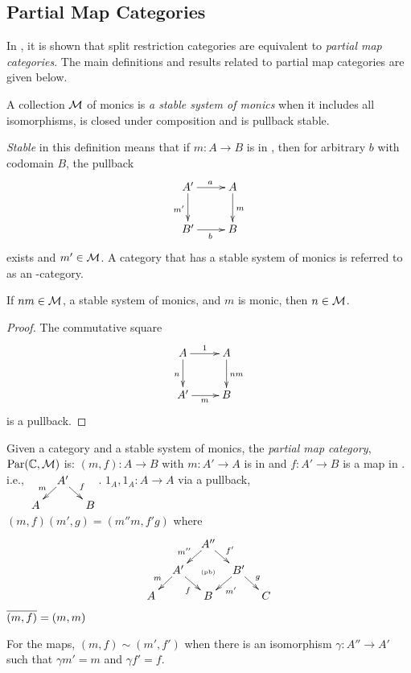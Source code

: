 \subsection{Partial Map Categories} %
\label{sub:partial_map_categories}

In \cite{cockett2002:restcategories1}, it is shown that split restriction categories are
equivalent to \emph{partial map categories}. The main definitions and results related to
partial map categories are given below.

\begin{definition}
  A collection $\mathcal{M}$ of monics is \emph{a stable system of monics}
  when it includes all isomorphisms, is closed under composition and is
  pullback stable.
\end{definition}

\emph{Stable} in this definition means that if $m:A\to B$ is in \Mstab, then for arbitrary
$b$ with codomain $B$, the pullback
\[
  \xymatrix{
    A'\ar[r]^a \ar[d]_{m'} &A\ar[d]^{m}\\
    B' \ar[r]_{b} & B
  }
\]
exists and $m' \in \mathcal{M}$. A category that has a stable system of monics
is referred to as an \Mstab-category.

\begin{lemma}
  If $nm \in \mathcal{M}$, a stable system of monics, and $m$ is monic, then $n \in \mathcal{M}$.
\end{lemma}
\begin{proof}
  The commutative square
  \[
    \xymatrix{
      A\ar[d]_n \ar[r]^{1} &A\ar[d]^{nm}\\
      A' \ar[r]_{m} & B
    }
  \]
  is a pullback.
\end{proof}

Given a category \C and a stable system of monics, the \emph{partial map category},
$\text{Par}(\mathbb{C},\mathcal{M})$ is:
    {$(m,f):A\to B$  with $m:A' \to A$ is in \Mstab and $f:A' \to B$ is a map in \C. i.e.,
      $\xymatrix @R-15pt @C-15pt{&A'\ar[dl]_{m} \ar[dr]^{f}\\A&&B}$.}
    {$1_A,1_A:A \to A$}
    {via a pullback, $(m,f)(m',g) = (m'' m, f' g)$ where
      \[
        \xymatrix @C-15pt @R-15pt{
          &&A''\ar[dl]_{m''}\ar[dr]^{f'}\\
          &A'\ar[dl]_{m}\ar[dr]_{f}&\text{{\tiny (pb)}}&B'\ar[dl]^{m'}\ar[dr]^{g}\\
          A&&B&&C
        }
      \]
    }
    {$\overline{(m,f)} = (m,m)$}

For the maps, $(m,f) \sim (m',f')$ when there is an isomorphism $\gamma : A'' \to A'$
such that $\gamma m' = m$ and $\gamma f' = f$.

